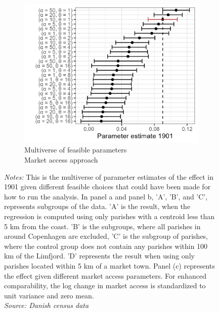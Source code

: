 \begin{figure}[H]
\begin{subfigure}[b]{0.45\textwidth}
    \end{subfigure}
    \vspace{0.45cm}
    \begin{subfigure}[b]{0.45\textwidth}
        \centering
        \caption{\label{fig:mult3} Multiverse of feasible parameters\\Market access approach}
        \includegraphics[width=\textwidth]{Plots/Regression_plots/Multiverse_MA_param.png}
    \end{subfigure}
    \parbox{0.9\textwidth}{
    \caption*{\footnotesize \textit{Notes:} This is the multiverse of parameter estimates of the effect in 1901 given different feasible choices that could have been made for how to run the analysis. In panel a and panel b, 'A', 'B', and 'C', represents subgroups of the data. 'A' is the result, when the regression is computed using only parishes with a centroid less than 5 km from the coast. 'B' is the subgroups, where all parishes in around Copenhagen are excluded, 'C' is the subgroup of parishes, where the control group does not contain any parishes within 100 km of the Limfjord. 'D' represents the result when using only parishes located within 5 km of a market town. Panel (c) represents the effect given different market access parameters. For enhanced comparability, the log change in market access is standardized to unit variance and zero mean. \\ \textit{Source: Danish census data}}
} \label{fig:pop2}
\end{figure}

